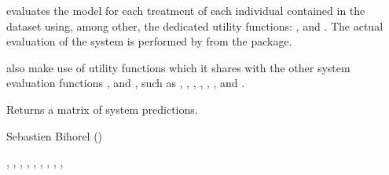 %
\begin{Details}\relax
{} evaluates the model for each treatment of each individual 
contained in the dataset using, among other, the dedicated utility functions:
, and . The actual evaluation of the system is 
performed by  from the  package.

 also make use of utility functions which it shares with the 
other system evaluation functions , and ,
such as , , , 
, , , and 
.
\end{Details}
%
\begin{Value}
Returns a matrix of system predictions.
\end{Value}
%
\begin{Author}\relax
Sebastien Bihorel ()
\end{Author}
%
\begin{SeeAlso}\relax
{},
, , 
, ,
, ,
, ,
\end{SeeAlso}
